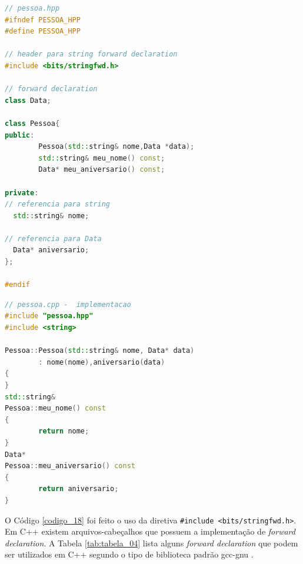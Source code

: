 \begin{lstlisting}[language=C++,caption={Arquivo definição da classe Pessoa,       
                          utilizando \textit{forward declaration}},
                                                label=codigo_18]
// pessoa.hpp 
#ifndef PESSOA_HPP
#define PESSOA_HPP

// header para string forward declaration
#include <bits/stringfwd.h>    

// forward declaration
class Data;            

class Pessoa{
public:
        Pessoa(std::string& nome,Data *data);
        std::string& meu_nome() const;
        Data* meu_aniversario() const;

private:
// referencia para string
  std::string& nome;

// referencia para Data
  Data* aniversario;
};

#endif

\end{lstlisting}


\begin{lstlisting}[language=C++,caption={ 
Definição da classe Pessoa, utilizando \textit{forward declaration}},
                                                    label=codigo_19]
// pessoa.cpp -  implementacao
#include "pessoa.hpp"
#include <string>

Pessoa::Pessoa(std::string& nome, Data* data)
        : nome(nome),aniversario(data)
{
}
std::string&
Pessoa::meu_nome() const
{
        return nome;
}
Data*
Pessoa::meu_aniversario() const
{
        return aniversario;
}

\end{lstlisting}


O Código \ref{codigo_18} foi feito o uso da diretiva \texttt{\#include
 <bits/stringfwd.h>}. Em C++  existem arquivos-cabeçalhos que possuem a
 implementação de \textit{forward declaration}. A Tabela \ref{tab:tabela_04} lista 
 alguns \textit{forward declaration} que podem ser utilizados em C++ segundo
 o tipo de biblioteca padrão gcc-gnu \cite{gccapi}.

